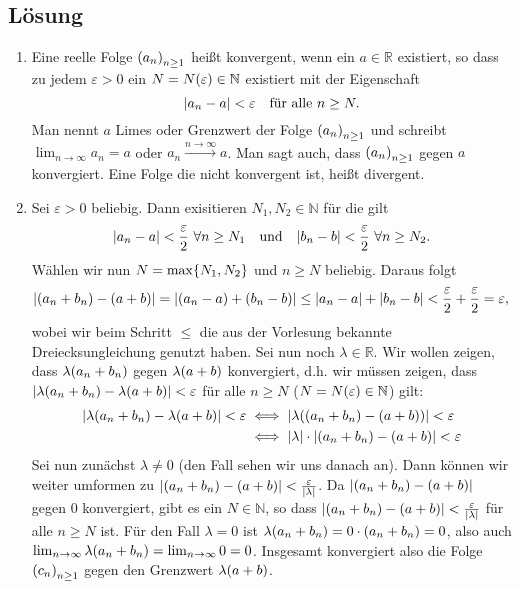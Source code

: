 \documentclass[german,12pt]{homework}
\newcommand{\NN}{\mathbb{N}}
\newcommand{\RR}{\mathbb{R}}
\DeclarePairedDelimiter{\absolute}{\lvert}{\rvert}
\DeclarePairedDelimiter{\enbrace}{(}{)}
\DeclarePairedDelimiter{\penbrace}{\{}{\}}
\begin{document}
    \subsection*{Lösung}
    \begin{enumerate}
        \item Eine reelle Folge \(\enbrace*{a_n}_{n \ge 1}\) heißt konvergent, wenn ein \(a \in \RR\) existiert, so dass zu jedem \(\varepsilon > 0\) ein \(N = N\enbrace*{\varepsilon} \in \NN\) existiert mit der Eigenschaft
        \[\absolute*{a_n - a} < \varepsilon \quad \text{für alle }n \ge N.\]
        Man nennt \(a\) Limes oder Grenzwert der Folge \(\enbrace*{a_n}_{n \ge 1}\) und schreibt \(\lim_{n \to \infty}a_n = a\) oder \(a_n \xrightarrow{n \to \infty} a\). Man sagt auch, dass \(\enbrace*{a_n}_{n \ge 1}\) gegen \(a\) konvergiert. Eine Folge die nicht konvergent ist, heißt divergent.
        \item Sei \(\varepsilon > 0\) beliebig. Dann exisitieren \(N_1, N_2 \in \NN\) für die gilt
        \[\absolute*{a_n - a} < \frac{\varepsilon}{2}\ \forall{n \ge N_1} \quad \text{und} \quad \absolute*{b_n - b} < \frac{\varepsilon}{2}\ \forall{n \ge N_2}.\]
        Wählen wir nun \(N = \max\penbrace*{N_1, N_2}\) und \(n \ge N\) beliebig. Daraus folgt
        \[\absolute*{\enbrace*{a_n + b_n} - \enbrace*{a + b}} = \absolute*{\enbrace*{a_n - a} + \enbrace*{b_n - b}} \le \absolute*{a_n - a} + \absolute*{b_n - b} < \frac{\varepsilon}{2} + \frac{\varepsilon}{2} = \varepsilon,\]
        wobei wir beim Schritt \(\le\) die aus der Vorlesung bekannte Dreiecksungleichung genutzt haben. Sei nun noch \(\lambda \in \RR\). Wir wollen zeigen, dass \(\lambda\enbrace*{a_n + b_n}\) gegen \(\lambda\enbrace*{a + b}\) konvergiert, d.h. wir müssen zeigen, dass \(\absolute*{\lambda\enbrace*{a_n + b_n} - \lambda\enbrace*{a + b}} < \varepsilon\) für alle \(n \ge N\) (\(N = N\enbrace*{\varepsilon} \in \NN\)) gilt:
        \begin{align*}
            \absolute*{\lambda\enbrace*{a_n + b_n} - \lambda\enbrace*{a + b}} < \varepsilon &\iff \absolute*{\lambda\enbrace*{\enbrace*{a_n + b_n} - \enbrace*{a + b}}} < \varepsilon\\
            &\iff \absolute*{\lambda} \cdot \absolute*{\enbrace*{a_n + b_n} - \enbrace*{a + b}} < \varepsilon
        \end{align*}
        Sei nun zunächst \(\lambda \ne 0\) (den Fall sehen wir uns danach an). Dann können wir weiter umformen zu \(\absolute*{\enbrace*{a_n + b_n} - \enbrace*{a + b}} < \frac{\varepsilon}{\absolute*{\lambda}}\). Da \(\absolute*{\enbrace*{a_n + b_n} - \enbrace*{a + b}}\) gegen \(0\) konvergiert, gibt es ein \(N \in \NN\), so dass \(\absolute*{\enbrace*{a_n + b_n} - \enbrace*{a + b}} < \frac{\varepsilon}{\absolute*{\lambda}}\) für alle \(n \ge N\) ist. Für den Fall \(\lambda = 0\) ist \(\lambda\enbrace*{a_n + b_n} = 0 \cdot \enbrace*{a_n + b_n} = 0\), also auch \(\lim_{n \to \infty}\lambda\enbrace*{a_n + b_n} = \lim_{n \to \infty}0 = 0\). Insgesamt konvergiert also die Folge \(\enbrace*{c_n}_{n \ge 1}\) gegen den Grenzwert \(\lambda\enbrace*{a + b}\).
    \end{enumerate}
\end{document}
